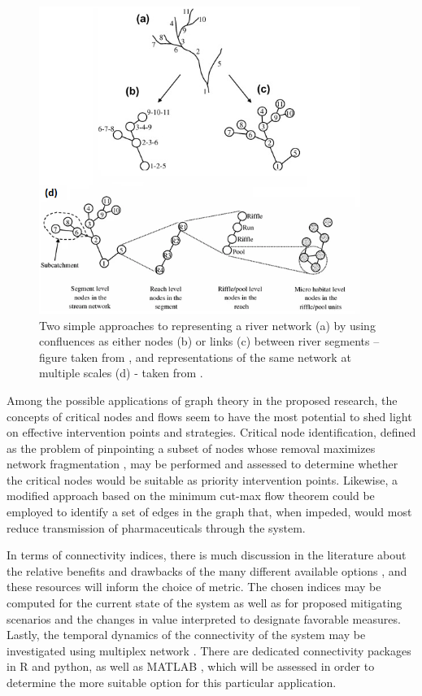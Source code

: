 \documentclass{article}
\begin{document}
\begin{figure}[h]
    \centering
    \includegraphics[height=10cm]{fig_graph_eros.png}
    \caption{Two simple approaches to representing a river network (a) by using confluences as either nodes (b) or links (c) between river segments  – figure taken from \citet{Eros2011NetworkApproach},
 and  representations of the same network at multiple scales (d) - taken from \citet{Eros2012CharacterizingGraphs}. 
}
    \label{fig_graph_eros}
\end{figure}

Among the possible applications of graph theory in the proposed research, the concepts of critical nodes and flows seem to have the most potential to shed light on effective intervention points and strategies. Critical node identification, defined as the problem of pinpointing a subset of nodes whose removal maximizes network fragmentation \citep{Lalou2018TheSurvey,Sarker2019CriticalNetworks}, may be performed and assessed to determine whether the critical nodes would be suitable as priority intervention points. Likewise, a modified approach based on the minimum cut-max flow theorem \citep{Anderson2020ComplexApplications} could be employed to identify a set of edges in the graph that, when impeded, would most reduce transmission of pharmaceuticals through the system.

In terms of connectivity indices, there is much discussion in the literature about the relative benefits and drawbacks of the many different available options \citep{Ali2010ShoppingCatchment,Saura2007AStudy}, and these resources will inform the choice of metric. The chosen indices may be computed for the current state of the system as well as for proposed mitigating scenarios and the changes in value interpreted to designate favorable measures. Lastly, the temporal dynamics of the connectivity of the system may be investigated using multiplex network \citep{Pearson2020SedimentPathways}. 
There are dedicated connectivity packages in R and python, as well as MATLAB \citep{Rubinov2010ComplexInterpretations}, which will be assessed in order to determine the more suitable option for this particular application.
\end{document}
